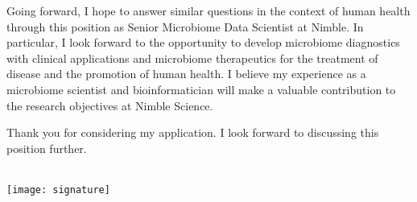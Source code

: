 \documentclass[11pt,letterpaper,sans]{moderncv}        %
\makeatletter
\renewcommand*{\makeletterclosing}{
  \@closing\\[3em]%
  \texttt{[image: signature]}\\%
  {\bfseries \@firstname~\@lastname}%
  \ifthenelse{\isundefined{\@enclosure}}{}{%
    \\%
    \vfill%
    {\color{color2}\itshape\enclname: \@enclosure}}}
\makeatother
\begin{document}
Going forward, I hope to answer similar questions in the context of human
health through this position as Senior Microbiome Data Scientist at Nimble. In particular, I look
forward to the opportunity to develop microbiome diagnostics with clinical
applications and microbiome therapeutics for the treatment of disease and the
promotion of human health. I believe my experience as a microbiome scientist
and bioinformatician will make a valuable contribution to the research
objectives at Nimble Science.

Thank you for considering my application. I look forward to discussing this
position further.


\makeletterclosing

\end{document}
